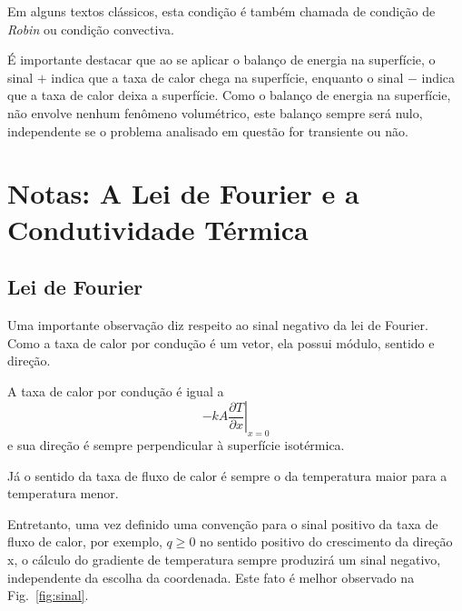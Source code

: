 Em alguns textos clássicos, esta condição é também chamada de condição de \textit{Robin} ou condição convectiva. 

É importante destacar que ao se aplicar o balanço de energia na superfície, o sinal $+$ indica que a taxa de calor chega na superfície, enquanto o sinal $-$ indica que a taxa de calor deixa a superfície. Como o balanço de energia na superfície, não envolve nenhum fenômeno volumétrico, este balanço sempre será nulo, independente se o problema analisado em questão for transiente ou não.

\section{Notas: A Lei de Fourier e a Condutividade Térmica}

\subsection{Lei de Fourier}
Uma importante observação diz respeito ao sinal negativo da lei de Fourier. Como a taxa de calor por condução é um vetor, ela possui módulo, sentido e direção.

A taxa de calor por condução é igual a
\begin{equation}\label{eq:q7}
- k A \left.{\frac{\partial{T}}{\partial{x}}}\right|_{x=0} 
\end{equation}
e sua direção é sempre perpendicular à superfície isotérmica. 

Já o sentido da taxa de fluxo de calor é sempre o da temperatura maior para a temperatura menor.

Entretanto, uma vez definido uma convenção para o sinal positivo da taxa de fluxo de calor, por exemplo, $q \geq 0$ no sentido positivo do crescimento da direção \;x, o cálculo do gradiente de temperatura sempre produzirá um sinal negativo, independente da escolha da coordenada. Este fato é melhor observado na  Fig.~\ref{fig:sinal}.

